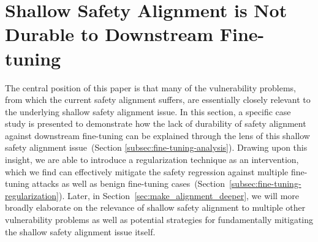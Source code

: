 \section{Shallow Safety Alignment is Not Durable to Downstream Fine-tuning}
\label{sec:fine-tuning-safety-improvement}

The central position of this paper is that many of the vulnerability problems, from which the current safety alignment suffers, are essentially closely relevant to the underlying shallow safety alignment issue. In this section, a specific case study is presented to demonstrate how the lack of durability of safety alignment against downstream fine-tuning can be explained through the lens of this shallow safety alignment issue~(Section \ref{subsec:fine-tuning-analysis}). Drawing upon this insight, we are able to introduce a regularization technique as an intervention, which we find can effectively mitigate the safety regression against multiple fine-tuning attacks as well as benign fine-tuning cases~(Section~\ref{subsec:fine-tuning-regularization}). Later, in Section~\ref{sec:make_alignment_deeper}, we will more broadly elaborate on the relevance of shallow safety alignment to multiple other vulnerability problems as well as potential strategies for fundamentally mitigating the shallow safety alignment issue itself.











